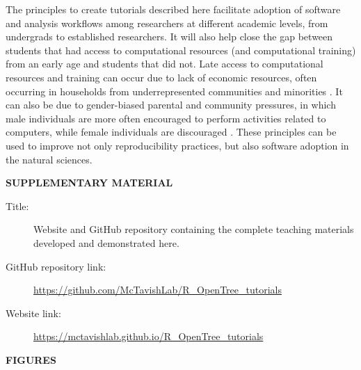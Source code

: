 \documentclass[12pt]{article}
\begin{document}
The principles to create tutorials described here facilitate adoption of software
and analysis workflows among researchers at different academic levels, from undergrads
to established researchers.
It will also help close the gap between students that had access to computational
resources (and computational training) from an early age and students that did not.
Late access to computational resources and training can occur due to lack of
economic resources, often occurring in households from underrepresented communities
and minorities \citep{google2016diversity, warner2021quantifying}.
It can also be due to gender-biased parental and community pressures,
in which male individuals are more often encouraged to perform activities related to computers,
while female individuals are discouraged \citep{warner2021quantifying}.
These principles can be used to improve not only reproducibility practices,
but also software adoption in the natural sciences.


\bigskip
\begin{center}
{\large\bf SUPPLEMENTARY MATERIAL}
\end{center}

\begin{description}

\item[Title:] Website and GitHub repository containing the complete teaching materials developed and demonstrated here.

\item[GitHub repository link:] \url{https://github.com/McTavishLab/R_OpenTree_tutorials}

\item[Website link:] \url{https://mctavishlab.github.io/R_OpenTree_tutorials}

\end{description}


\pagebreak

\begin{center}
{\large\bf FIGURES}
\end{center}

\newline
\newline
\newline
\end{document}

